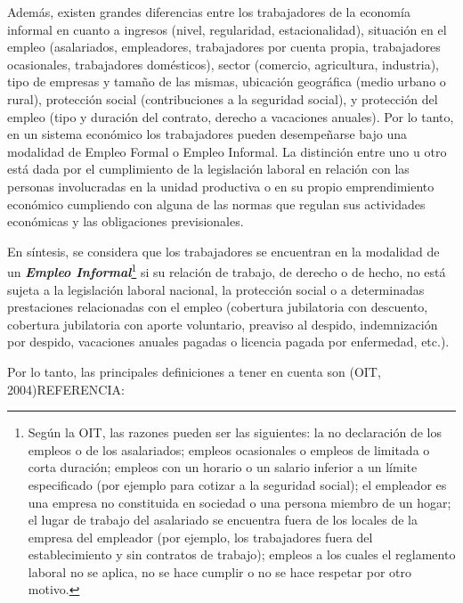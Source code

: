\documentclass[
  openany]{book}
\begin{document}
Además, existen grandes diferencias entre los trabajadores de la economía informal en cuanto a ingresos (nivel, regularidad, estacionalidad), situación en el empleo (asalariados, empleadores, trabajadores por cuenta propia, trabajadores ocasionales, trabajadores domésticos), sector (comercio, agricultura, industria), tipo de empresas y tamaño de las mismas, ubicación geográfica (medio urbano o rural), protección social (contribuciones a la seguridad social), y protección del empleo (tipo y duración del contrato, derecho a vacaciones anuales).
Por lo tanto, en un sistema económico los trabajadores pueden desempeñarse bajo una modalidad de Empleo Formal o Empleo Informal. La distinción entre uno u otro está dada por el cumplimiento de la legislación laboral en relación con las personas involucradas en la unidad productiva o en su propio emprendimiento económico cumpliendo con alguna de las normas que regulan sus actividades económicas y las obligaciones previsionales.

En síntesis, se considera que los trabajadores se encuentran en la modalidad de un \textbf{\emph{Empleo Informal}}\footnote{Según la OIT, las razones pueden ser las siguientes: la no declaración de los empleos o de los asalariados; empleos ocasionales o empleos de limitada o corta duración; empleos con un horario o un salario inferior a un límite especificado (por ejemplo para cotizar a la seguridad social); el empleador es una empresa no constituida en sociedad o una persona miembro de un hogar; el lugar de trabajo del asalariado se encuentra fuera de los locales de la empresa del empleador (por ejemplo, los trabajadores fuera del establecimiento y sin contratos de trabajo); empleos a los cuales el reglamento laboral no se aplica, no se hace cumplir o no se hace respetar por otro motivo.} si su relación de trabajo, de derecho o de hecho, no está sujeta a la legislación laboral nacional, la protección social o a determinadas prestaciones relacionadas con el empleo (cobertura jubilatoria con descuento, cobertura jubilatoria con aporte voluntario, preaviso al despido, indemnización por despido, vacaciones anuales pagadas o licencia pagada por enfermedad, etc.).

Por lo tanto, las principales definiciones a tener en cuenta son (OIT, 2004)REFERENCIA:
\end{document}
